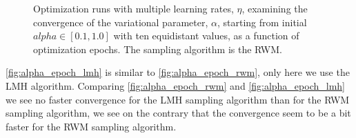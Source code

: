 \begin{figure}[!htb]
\qquad
{}
\caption{Optimization runs with multiple learning rates, $\eta$, examining the convergence of the variational parameter, $\alpha$, starting from initial $alpha\in[0.1,1.0]$ with ten equidistant values, as a function of optimization epochs. The sampling algorithm is the RWM.}
\label{fig:alpha_epoch_rwm}
\end{figure}

\autoref{fig:alpha_epoch_lmh} is similar to \autoref{fig:alpha_epoch_rwm}, only here we use the LMH algorithm. Comparing \autoref{fig:alpha_epoch_rwm} and \autoref{fig:alpha_epoch_lmh} we see no faster convergence for the LMH sampling algorithm than for the RWM sampling algorithm, we see on the contrary that the convergence seem to be a bit faster for the RWM sampling algorithm.

